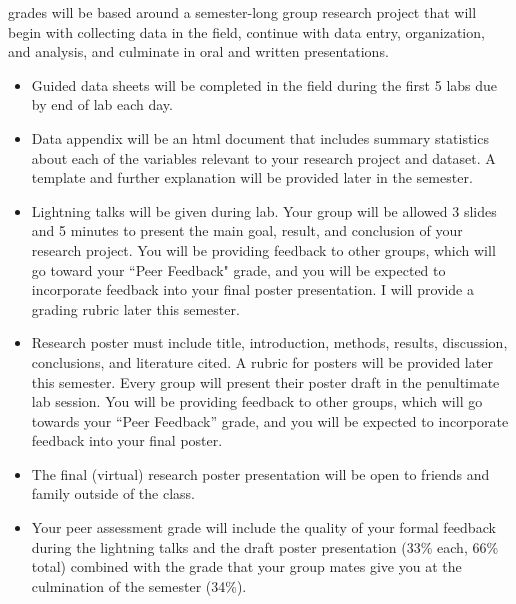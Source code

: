 \documentclass{tufte-handout}
\begin{document}
\begin{fullwidth}

 grades will be based around a semester-long group research project that will begin with collecting data in the field, continue with data entry, organization, and analysis, and culminate in oral and written presentations. 

\begin{itemize}
\item Guided data sheets will be completed in the field during the first 5 labs due by end of lab each day. %
\item Data appendix will be an html document that includes summary statistics about each of the variables relevant to your research project and dataset. A template and further explanation will be provided later in the semester. 
\item Lightning talks will be given during lab. Your group will be allowed 3 slides and 5 minutes to present the main goal, result, and conclusion of your research project. You will be providing feedback to other groups, which will go toward your ``Peer Feedback" grade, and you will be expected to incorporate feedback into your final poster presentation. I will provide a grading rubric later this semester.
\item Research poster must include title, introduction, methods, results, discussion, conclusions, and literature cited. A rubric for posters will be provided later this semester. Every group will present their poster draft in the penultimate lab session. You will be providing feedback to other groups, which will go towards your ``Peer Feedback'' grade, and you will be expected to incorporate feedback into your final poster. 
\item The final (virtual) research poster presentation will be open to friends and family outside of the class.
\item Your peer assessment grade will include the quality of your formal feedback during the lightning talks and the draft poster presentation (33\% each, 66\% total) combined with the grade that your group mates give you at the culmination of the semester (34\%). 
\end{itemize}


\end{fullwidth}
\end{document}
